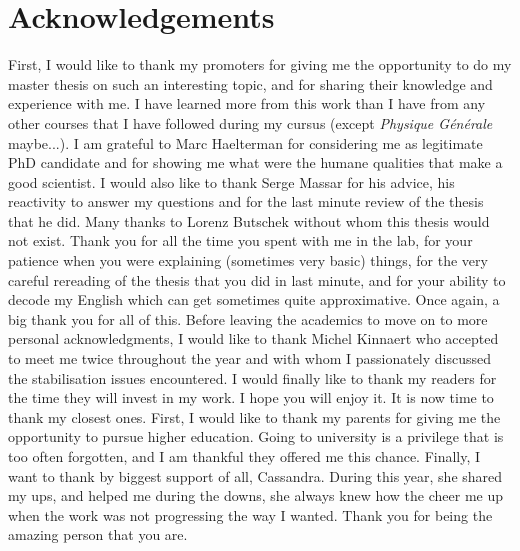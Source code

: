 \chapter*{Acknowledgements}

First, I would like to thank my promoters for giving me the opportunity to do my master thesis on such an interesting topic, and for sharing their knowledge and experience with me. I have learned more from this work than I have from any other courses that I have followed during my cursus (except \textit{Physique Générale} maybe...). I am grateful to Marc Haelterman for considering me as legitimate PhD candidate and for showing me what were the humane qualities that make a good scientist. I would also like to thank Serge Massar for his advice, his reactivity to answer my questions and for the last minute review of the thesis that he did. Many thanks to Lorenz Butschek without whom this thesis would not exist. Thank you for all the time you spent with me in the lab, for your patience when you were explaining (sometimes very basic) things, for the very careful rereading of the thesis that you did in last minute, and for your ability to decode my English which can get sometimes quite approximative. Once again, a big thank you for all of this. Before leaving the academics to move on to more personal acknowledgments, I would like to thank Michel Kinnaert who accepted to meet me twice throughout the year and with whom I passionately discussed the stabilisation issues encountered. I would finally like to thank my readers for the time they will invest in my work. I hope you will enjoy it. It is now time to thank my closest ones. First, I would like to thank my parents for giving me the opportunity to pursue higher education. Going to university is a privilege that is too often forgotten, and I am thankful they offered me this chance. Finally, I want to thank by biggest support of all, Cassandra. During this year, she shared my ups, and helped me during the downs, she always knew how the cheer me up when the work was not progressing the way I wanted. Thank you for being the amazing person that you are.